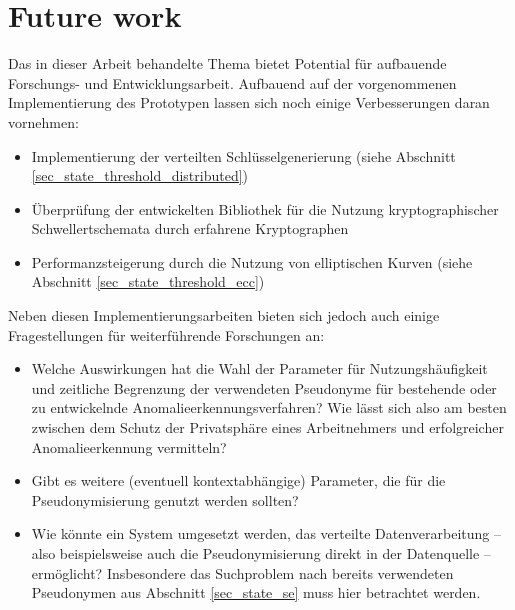 %

\section{Future work}
%

Das in dieser Arbeit behandelte Thema bietet Potential für aufbauende Forschungs- und Entwicklungsarbeit. Aufbauend auf der vorgenommenen Implementierung des Prototypen lassen sich noch einige Verbesserungen daran vornehmen:

\begin{itemize}
  \item Implementierung der verteilten Schlüsselgenerierung (siehe Abschnitt \ref{sec_state_threshold_distributed})
  \item Überprüfung der entwickelten Bibliothek für die Nutzung kryptographischer Schwellertschemata durch erfahrene Kryptographen
  \item Performanzsteigerung durch die Nutzung von elliptischen Kurven (siehe Abschnitt \ref{sec_state_threshold_ecc})
\end{itemize}

Neben diesen Implementierungsarbeiten bieten sich jedoch auch einige Fragestellungen für weiterführende Forschungen an:

\begin{itemize}
  \item Welche Auswirkungen hat die Wahl der Parameter für Nutzungshäufigkeit und zeitliche Begrenzung der verwendeten Pseudonyme für bestehende oder zu entwickelnde Anomalieerkennungsverfahren? Wie lässt sich also am besten zwischen dem Schutz der Privatsphäre eines Arbeitnehmers und erfolgreicher Anomalieerkennung vermitteln?
  \item Gibt es weitere (eventuell kontextabhängige) Parameter, die für die Pseudonymisierung genutzt werden sollten?
  \item Wie könnte ein System umgesetzt werden, das verteilte Datenverarbeitung -- also beispielsweise auch die Pseudonymisierung direkt in der Datenquelle -- ermöglicht? Insbesondere das Suchproblem nach bereits verwendeten Pseudonymen aus Abschnitt \ref{sec_state_se} muss hier betrachtet werden.
\end{itemize}



